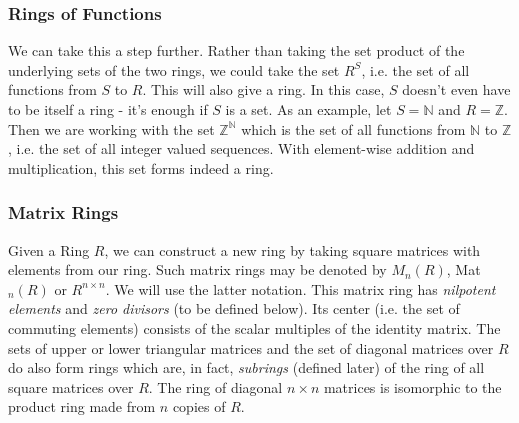

\subsubsection{Rings of Functions}
We can take this a step further. Rather than taking the set product of the underlying sets of the two rings, we could take the set $R^S$, i.e. the set of all functions from $S$ to $R$. This will also give a ring. In this case, $S$ doesn't even have to be itself a ring - it's enough if $S$ is a set. As an example, let $S = \mathbb{N}$ and $R = \mathbb{Z}$. Then we are working with the set $\mathbb{Z}^\mathbb{N}$ which is the set of all functions from $\mathbb{N}$ to $\mathbb{Z}$, i.e. the set of all integer valued sequences. With element-wise addition and multiplication, this set forms indeed a ring.





\subsubsection{Matrix Rings}
Given a Ring $R$, we can construct a new ring by taking square matrices with elements from our ring. Such matrix rings may be denoted by $M_n(R)$, Mat$_n(R)$ or $R^{n \times n}$. We will use the latter notation. This matrix ring has \emph{nilpotent elements} and \emph{zero divisors} (to be defined below). Its center (i.e. the set of commuting elements) consists of the scalar multiples of the identity matrix. The sets of upper or lower triangular matrices and the set of diagonal matrices over $R$ do also form rings which are, in fact, \emph{subrings} (defined later) of the ring of all square matrices over $R$. The ring of diagonal $n \times n$ matrices is isomorphic to the product ring made from $n$ copies of $R$.


